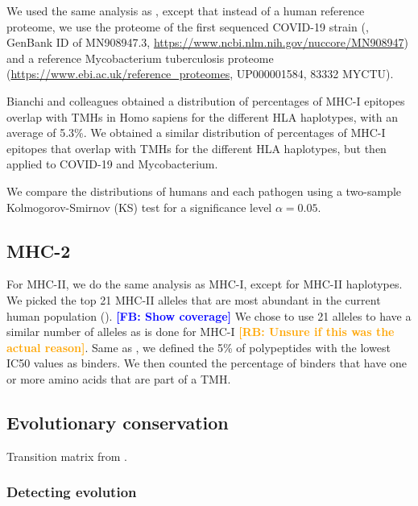\documentclass{article}
\newcommand{\frans}[1]{\textcolor{blue}{\textbf{[FB: #1]}}}
\newcommand{\richel}[1]{\textcolor{orange}{\textbf{[RB: #1]}}}
\begin{document}
We used the same analysis as \cite{bianchi2017},
except that instead of a human reference proteome,
we use the proteome of the first sequenced COVID-19 strain (\cite{wu2020new},
GenBank ID of MN908947.3, \url{https://www.ncbi.nlm.nih.gov/nuccore/MN908947})
and a reference Mycobacterium tuberculosis 
proteome (\url{https://www.ebi.ac.uk/reference_proteomes}, UP000001584, 
83332 MYCTU).

Bianchi and colleagues obtained a distribution of 
percentages of MHC-I epitopes overlap with TMHs in Homo sapiens
for the different HLA haplotypes, with an average of 5.3\%.
We obtained a similar distribution of percentages of MHC-I epitopes that 
overlap with TMHs for the different HLA haplotypes, but then applied to
COVID-19 and Mycobacterium.

We compare the distributions of humans and each pathogen
using a two-sample Kolmogorov-Smirnov (KS) test
for a significance level $\alpha = 0.05$.

\subsection{MHC-2}


For MHC-II, we do the same analysis as MHC-I, except for
MHC-II haplotypes. We picked the top 21 MHC-II alleles that are most abundant 
in the current human population (\cite{greenbaum2011functional}).
\frans{Show coverage}
We chose to use 21 alleles to have a similar number of alleles as is done
for MHC-I \richel{Unsure if this was the actual reason}.
Same as \cite{bianchi2017}, we defined the 5\% of polypeptides 
with the lowest IC50 values as binders. We then counted the percentage
of binders that have one or more amino acids that are part of a TMH.


\subsection{Evolutionary conservation}

Transition matrix from \cite{dang2010flu}.

\subsubsection{Detecting evolution}
\end{document}
